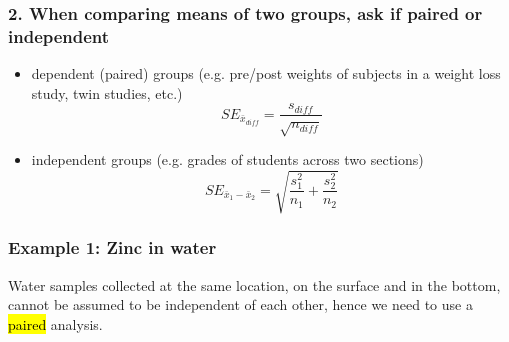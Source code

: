 \documentclass[11pt,containsverbatim,handout,xcolor=xelatex,dvipsnames,table]{beamer}
\begin{document}
\begin{frame}
\frametitle{2. When comparing means of two groups, ask if paired or independent}

\begin{itemize}

\item dependent (paired) groups (e.g. pre/post weights of subjects in a weight loss study, twin studies, etc.)
\[ SE_{\bar{x}_{diff}} = \frac{s_{diff}}{\sqrt{n_{diff}}} \]

\item independent groups (e.g. grades of students across two sections)
\[ SE_{\bar{x}_1 - \bar{x}_2} = \sqrt{ \frac{s_1^2}{n_1} + \frac{s_2^2}{n_2} } \]

\end{itemize}

\end{frame}


\begin{frame}
\frametitle{Example 1: Zinc in water}


{
\pause
Water samples collected at the same location, on the surface and in the bottom, cannot be assumed to be independent of each other, hence we need to use a \hl{paired} analysis.
}

\vfill


\end{frame}
\end{document}

